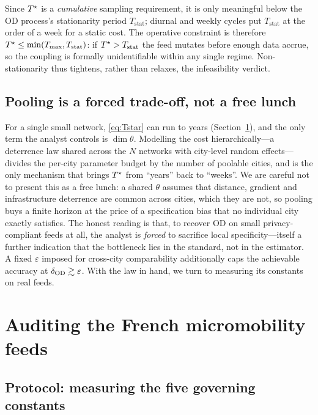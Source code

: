 \begin{remark}
\label{rem:stationarity}
Since $T^{\star}$ is a \emph{cumulative} sampling requirement, it is only meaningful
below the OD process's stationarity period $T_{\mathrm{stat}}$; diurnal and
weekly cycles put $T_{\mathrm{stat}}$ at the order of a week for a static cost.
The operative constraint is therefore $T^{\star} \le \min(T_{\max},
T_{\mathrm{stat}})$: if $T^{\star} > T_{\mathrm{stat}}$ the feed mutates before
enough data accrue, so the coupling is formally unidentifiable within any single
regime. Non-stationarity thus tightens, rather than relaxes, the infeasibility
verdict.
\end{remark}

\subsection{Pooling is a forced trade-off, not a free lunch}
\label{sec:pooling}

For a single small network, \eqref{eq:Tstar} can run to years (Section~\ref{sec:audit}),
and the only term the analyst controls is $\dim\theta$. Modelling the cost
hierarchically---a deterrence law shared across the $N$ networks with city-level
random effects---divides the per-city parameter budget by the number of poolable
cities, and is the only mechanism that brings $T^{\star}$ from ``years'' back to
``weeks''. We are careful not to present this as a free lunch: a shared $\theta$
assumes that distance, gradient and infrastructure deterrence are common across
cities, which they are not, so pooling buys a finite horizon at the price of a
specification bias that no individual city exactly satisfies. The honest reading
is that, to recover OD on small privacy-compliant feeds at all, the analyst is
\emph{forced} to sacrifice local specificity---itself a further indication that
the bottleneck lies in the standard, not in the estimator. A fixed $\varepsilon$
imposed for cross-city comparability additionally caps the achievable accuracy
at $\delta_{\mathrm{OD}}\gtrsim\varepsilon$. With the law in hand, we turn to measuring its
constants on real feeds.

\section{Auditing the French micromobility feeds}
\label{sec:audit}

\subsection{Protocol: measuring the five governing constants}
\label{sec:protocol}

